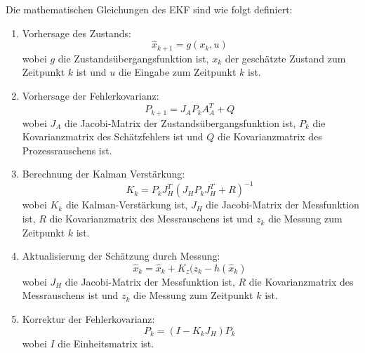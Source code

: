 Die mathematischen Gleichungen des EKF sind wie folgt definiert:
\begin{enumerate}
      \item Vorhersage des Zustands:
            \begin{equation*}
                  \hat{x}_{k+1} = g({x}_{k}, u)\
            \end{equation*}
            wobei $g$ die Zustandsübergangsfunktion ist,
            $x_{k}$ der geschätzte Zustand zum Zeitpunkt $k$ ist
            und $u$ die Eingabe zum Zeitpunkt $k$ ist.\\
      \item Vorhersage der Fehlerkovarianz:
            \begin{equation*}
                  P_{k + 1} = J_{A} P_{k} A_{A}^T + Q\
            \end{equation*}
            wobei $J_{A}$ die Jacobi-Matrix der Zustandsübergangsfunktion ist, 
            $P_{k}$ die Kovarianzmatrix des Schätzfehlers ist 
            und $Q$ die Kovarianzmatrix des Prozessrauschens ist.\\
      \item Berechnung der Kalman Verstärkung:
            \begin{equation*}
                  K_{k} = P_{k} J_{H}^T (J_{H} P_{k} J_{H}^T + R)^{-1}\
            \end{equation*}
            wobei $K_{k} $ die Kalman-Verstärkung ist,
             $J_{H}$ die Jacobi-Matrix der Messfunktion ist,
              $R$ die Kovarianzmatrix des Messrauschens ist und 
              $z_{k}$ die Messung zum Zeitpunkt $k$ ist.\\
      \item Aktualisierung der Schätzung durch Messung:
            \begin{equation*}
                  \hat{x}_{k} = \hat{x}_{k} + K_{z} (z_{k} - h (\hat{x}_{k})\
            \end{equation*}
            wobei $J_{H}$ die Jacobi-Matrix der Messfunktion ist,
             $R$ die Kovarianzmatrix des Messrauschens ist
              und $z_{k}$ die Messung zum Zeitpunkt $k$ ist.\\

      \item Korrektur der Fehlerkovarianz:
            \begin{equation*}
                  P_{k} = (I - K_{k} J_{H}) P_{k}\
            \end{equation*}
            wobei $I$ die Einheitsmatrix ist.\\
\end{enumerate}

